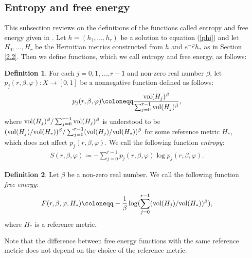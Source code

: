 \documentclass[12pt]{article}
\theoremstyle{definition}
\newtheorem{defi}{Definition}%
\def\refe{\ast}
\def\vol{{\rm vol}}
\begin{document}
\subsection{Entropy and free energy}\label{S and F}
This subsection reviews on the definitions of the functions called entropy and free energy given in \cite{Miy4, Miy5}. Let $h=(h_1,\dots, h_r)$ be a solution to equation (\ref{phi}) and let $H_1,\dots, H_r$ be the Hermitian metrics constructed from $h$ and $e^{-\varphi}h_\refe$ as in Section \ref{2.2}. Then we define functions, which we call entropy and free energy, as follows:
\begin{defi}\label{entropy2} 
For each $j=0, 1,\dots, r-1$ and non-zero real number $\beta$, let $p_j(r,\beta, \varphi):X\rightarrow [0,1]$ be a nonnegative function defined as follows:
\begin{align*}
p_j(r,\beta, \varphi)\coloneqq \frac{\vol(H_j)^\beta}{\sum_{j=0}^{r-1}\vol(H_j)^\beta},
\end{align*}
where $\vol(H_j)^\beta/\sum_{j=0}^{r-1}\vol(H_j)^\beta$ is understood to be $(\vol(H_j)/\vol(H_\refe))^\beta/\sum_{j=0}^{r-1}(\vol(H_j)/\vol(H_\refe))^\beta$ for some reference metric $H_\refe$, which does not affect $p_j(r,\beta,\varphi)$. We call the following function {\it entropy}:
\begin{align*}
S(r,\beta, \varphi)\coloneqq -\sum_{j=0}^{r-1} p_j(r, \beta, \varphi)\log p_j(r,\beta, \varphi).
\end{align*}
\end{defi}
\begin{defi}\label{F} Let $\beta$ be a non-zero real number. We call the following function {\it free energy}:
\begin{align*}
F(r,\beta,\varphi, H_\refe)\coloneqq -\frac{1}{\beta}\log(\sum_{j=0}^{r-1}(\vol(H_j)/\vol(H_\refe))^\beta),
\end{align*}
where $H_\refe$ is a reference metric. 
\end{defi}
Note that the difference between free energy functions with the same reference metric does not depend on the choice of the reference metric.
\end{document}
